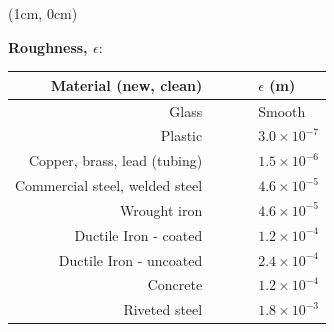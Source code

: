 \documentclass[9pt,xcolor={svgnames, x11names},professionalfonts, mathserif]{beamer}
\begin{document}
  \begin{frame}


   \begin{textblock*}{1\columnwidth}(1cm, 0cm)
    \begin{center}
     \textbf{Roughness, $\epsilon$}:
     \parb
     \begin{tabular}{rrl}
      \toprule
      Material (new, clean)          & $\qquad$ & $\epsilon$ (m)     \\
      \midrule
      \midrule
      Glass                          &          & Smooth             \\
      \midrule
      Plastic                        &          & $3.0\times10^{-7}$ \\
      \midrule
      Copper, brass, lead (tubing)   &          & $1.5\times10^{-6}$ \\
      \midrule
      Commercial steel, welded steel &          & $4.6\times10^{-5}$ \\
      \midrule
      Wrought iron                   &          & $4.6\times10^{-5}$ \\
      \midrule
      Ductile Iron - coated          &          & $1.2\times10^{-4}$ \\
      \midrule
      Ductile Iron - uncoated        &          & $2.4\times10^{-4}$ \\
      \midrule
      Concrete                       &          & $1.2\times10^{-4}$ \\
      \midrule
      Riveted steel                  &          & $1.8\times10^{-3}$ \\
      \midrule
      \bottomrule
     \end{tabular}
     \par\end{center}
     \end{textblock*}


     \end{frame}
\end{document}
